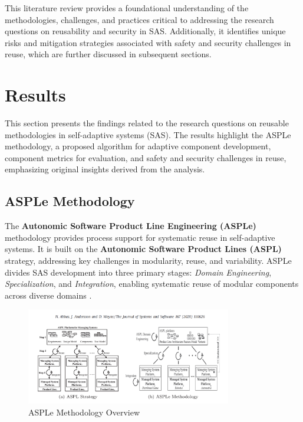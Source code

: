 \documentclass[a4paper,10pt]{article}
\begin{document}
This literature review provides a foundational understanding of the methodologies, challenges, and practices critical to addressing the research questions on reusability and security in SAS. Additionally, it identifies unique risks and mitigation strategies associated with safety and security challenges in reuse, which are further discussed in subsequent sections.

\section{Results}

This section presents the findings related to the research questions on reusable methodologies in self-adaptive systems (SAS). The results highlight the ASPLe methodology, a proposed algorithm for adaptive component development, component metrics for evaluation, and safety and security challenges in reuse, emphasizing original insights derived from the analysis.

\subsection{ASPLe Methodology}

The \textbf{Autonomic Software Product Line Engineering (ASPLe)} methodology provides process support for systematic reuse in self-adaptive systems. It is built on the \textbf{Autonomic Software Product Lines (ASPL)} strategy, addressing key challenges in modularity, reuse, and variability. ASPLe divides SAS development into three primary stages: \textit{Domain Engineering}, \textit{Specialization}, and \textit{Integration}, enabling systematic reuse of modular components across diverse domains \cite{Nadeem2020}.

\begin{figure}[ht]
\centering
\includegraphics[width=0.8\textwidth]{asple_diagram.png}
\caption{ASPLe Methodology Overview}
\label{fig:asple}
\end{figure}
\end{document}
